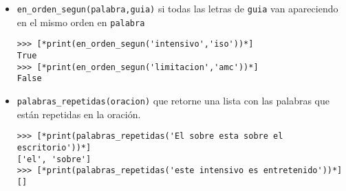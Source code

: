 \begin{itemize}
    \item \texttt{en\_orden\_segun(palabra,guia)} si todas las letras de \texttt{guia} van apareciendo en el mismo orden en \texttt{palabra}
    \begin{lstlisting}[style=consola]
>>> [*print(en_orden_segun('intensivo','iso'))*]
True
>>> [*print(en_orden_segun('limitacion','amc'))*]
False
    \end{lstlisting}
    
    \item \texttt{palabras\_repetidas(oracion)} que retorne una lista con las palabras que están repetidas en la oración.
    
    \begin{lstlisting}[style=consola]
>>> [*print(palabras_repetidas('El sobre esta sobre el escritorio'))*]
['el', 'sobre']
>>> [*print(palabras_repetidas('este intensivo es entretenido'))*]
[]
    \end{lstlisting}
\end{itemize}
